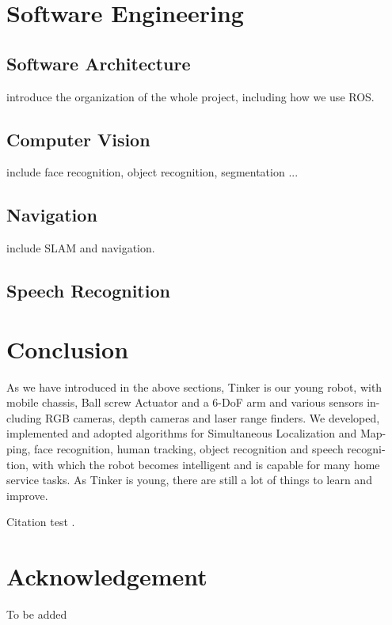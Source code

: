 \documentclass[journal,12pt,onecolumn]{IEEEtran}
\begin{document}
\section{Software Engineering}

\subsection{Software Architecture}

introduce the organization of the whole project, including how we use ROS.


\subsection{Computer Vision}
include face recognition, object recognition, segmentation ...


\subsection{Navigation}
include SLAM and navigation.


\subsection{Speech Recognition}




\section{Conclusion}

As we have introduced in the above sections, Tinker is our young robot, with mobile chassis, Ball screw Actuator and a 6-DoF arm and various sensors in- cluding RGB cameras, depth cameras and laser range finders. We developed, implemented and adopted algorithms for Simultaneous Localization and Map- ping, face recognition, human tracking, object recognition and speech recogni- tion, with which the robot becomes intelligent and is capable for many home service tasks. As Tinker is young, there are still a lot of things to learn and improve.

Citation test \cite{xia2015human}.

\section*{Acknowledgement}
To be added



\end{document}
